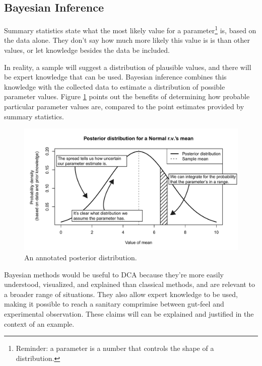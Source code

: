 \documentclass[11pt,a4paper,article]{memoir} %
\begin{document}
\newpage
\subsection*{Bayesian Inference}
Summary statistics state what the most likely value for a parameter\footnote{Reminder: a parameter is a number that controls the shape of a distribution.} is, based on the data alone. They don't say how much more likely this value is is than other values, or let knowledge besides the data be included.
\par
 In reality, a sample will suggest a distribution of plausible values, and there will be expert knowledge that can be used. Bayesian inference combines this knowledge with the collected data to estimate a distribution of possible parameter values. Figure \ref{fig:annotated_posterior} points out the benefits of determining how probable particular parameter values are, compared to the point estimates provided by summary statistics.
\begin{figure}[b]
\includegraphics[width=\textwidth]{annotated_posterior.pdf}
\caption{An annotated posterior distribution.}
\label{fig:annotated_posterior}
\end{figure}
\par
Bayesian methods would be useful to DCA because they're more easily understood, visualized, and explained than classical methods, and are relevant to a broader range of situations. They also allow expert knowledge to be used, making it possible to reach a sanitary comprimise between gut-feel and experimental observation. These claims will can be explained and justified in the context of an example.
\end{document}
